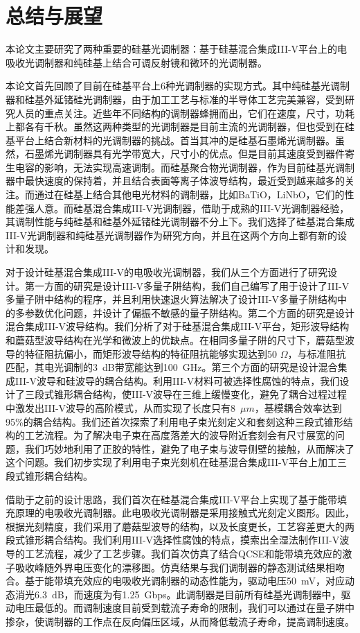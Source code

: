 \chapter{总结与展望}
本论文主要研究了两种重要的硅基光调制器：基于硅基混合集成III-V平台上的电吸收光调制器和纯硅基上结合可调反射镜和微环的光调制器。

本论文首先回顾了目前在硅基平台上6种光调制器的实现方式。其中纯硅基光调制器和硅基外延锗硅光调制器，由于加工工艺与标准的半导体工艺完美兼容，受到研究人员的重点关注。近些年不同结构的调制器蜂拥而出，它们在速度，尺寸，功耗上都各有千秋。虽然这两种类型的光调制器是目前主流的光调制器，但也受到在硅基平台上结合新材料的光调制器的挑战。首当其冲的是硅基石墨烯光调制器。虽然，石墨烯光调制器具有光学带宽大，尺寸小的优点。但是目前其速度受到器件寄生电容的影响，无法实现高速调制。而硅基聚合物光调制器，作为目前硅基光调制器中最快速度的保持着，并且结合表面等离子体波导结构，最近受到越来越多的关注。而通过在硅基上结合其他电光材料的调制器，比如BaTiO，LiNbO，它们的性能差强人意。而硅基混合集成III-V光调制器，借助于成熟的III-V光调制器经验，其调制性能与纯硅基和硅基外延锗硅光调制器不分上下。我们选择了硅基混合集成III-V光调制器和纯硅基光调制器作为研究方向，并且在这两个方向上都有新的设计和发现。

对于设计硅基混合集成III-V的电吸收光调制器，我们从三个方面进行了研究设计。第一方面的研究是设计III-V多量子阱结构，我们自己编写了用于设计了III-V多量子阱中结构的程序，并且利用快速退火算法解决了设计III-V多量子阱结构中的多参数优化问题，并设计了偏振不敏感的量子阱结构。第二个方面的研究是设计混合集成III-V波导结构。我们分析了对于硅基混合集成III-V平台，矩形波导结构和蘑菇型波导结构在光学和微波上的优缺点。在相同多量子阱的尺寸下，蘑菇型波导的特征阻抗偏小，而矩形波导结构的特征阻抗能够实现达到50 $\Omega$，与标准阻抗匹配，其电光调制的3~dB带宽能达到100~GHz。第三个方面的研究是设计混合集成III-V波导和硅波导的耦合结构。利用III-V材料可被选择性腐蚀的特点，我们设计了三段式锥形耦合结构，使III-V波导在三维上缓慢变化，避免了耦合过程过程中激发出III-V波导的高阶模式，从而实现了长度只有8~$\mu m$，基模耦合效率达到95\%的耦合结构。我们还首次探索了利用电子束光刻定义和套刻这种三段式锥形结构的工艺流程。为了解决电子束在高度落差大的波导附近套刻会有尺寸展宽的问题，我们巧妙地利用了正胶的特性，避免了电子束与波导侧壁的接触，从而解决了这个问题。我们初步实现了利用电子束光刻机在硅基混合集成III-V平台上加工三段式锥形耦合结构。

借助于之前的设计思路，我们首次在硅基混合集成III-V平台上实现了基于能带填充原理的电吸收光调制器。此电吸收光调制器是采用接触式光刻定义图形。因此，根据光刻精度，我们采用了蘑菇型波导的结构，以及长度更长，工艺容差更大的两段式锥形耦合结构。我们利用III-V选择性腐蚀的特点，摸索出全湿法制作III-V波导的工艺流程，减少了工艺步骤。我们首次仿真了结合QCSE和能带填充效应的激子吸收峰随外界电压变化的漂移图。仿真结果与我们调制器的静态测试结果相吻合。基于能带填充效应的电吸收光调制器的动态性能为，驱动电压50~mV，对应动态消光6.3~dB，而速度为有1.25~Gbps。此调制器是目前所有硅基光调制器中，驱动电压最低的。而调制速度目前受到载流子寿命的限制，我们可以通过在量子阱中掺杂，使调制器的工作点在反向偏压区域，从而降低载流子寿命，提高调制速度。

